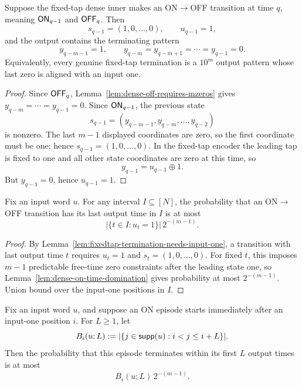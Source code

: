 \begin{lemma}
\label{lem:fixedtap-termination-needs-input-one}
Suppose the fixed-tap dense inner makes an ON\(\to\)OFF transition at time \(q\), meaning \(\mathsf{ON}_{q-1}\) and
\(\mathsf{OFF}_q\). Then
\[
s_{q-1}=(1,0,\dots,0),
\qquad
u_{q-1}=1,
\]
and the output contains the terminating pattern
\[
y_{q-m-1}=1,
\qquad
y_{q-m}=y_{q-m+1}=\cdots=y_{q-1}=0.
\]
Equivalently, every genuine fixed-tap termination is a \(10^m\) output pattern whose last zero is aligned with an input
one.
\end{lemma}

\begin{proof}
Since \(\mathsf{OFF}_q\), Lemma~\ref{lem:dense-off-requires-mzeros} gives
\(y_{q-m}=\cdots=y_{q-1}=0\). Since \(\mathsf{ON}_{q-1}\), the previous state
\[
s_{q-1}=(y_{q-m-1},y_{q-m},\dots,y_{q-2})
\]
is nonzero. The last \(m-1\) displayed coordinates are zero, so the first coordinate must be one; hence
\(s_{q-1}=(1,0,\dots,0)\). In the fixed-tap encoder the leading tap is fixed to one and all other state coordinates are
zero at this time, so
\[
y_{q-1}=u_{q-1}\oplus 1.
\]
But \(y_{q-1}=0\), hence \(u_{q-1}=1\).
\end{proof}

\begin{lemma}
\label{lem:fixedtap-termination-candidates}
Fix an input word \(u\). For any interval \(I\subseteq[N]\), the probability that an ON\(\to\)OFF transition has its
last output time in \(I\) is at most
\[
|\{t\in I:u_t=1\}|\,2^{-(m-1)}.
\]
\end{lemma}

\begin{proof}
By Lemma~\ref{lem:fixedtap-termination-needs-input-one}, a transition with last output time \(t\) requires \(u_t=1\)
and \(s_t=(1,0,\dots,0)\). For fixed \(t\), this imposes \(m-1\) predictable free-time zero constraints after the
leading state one, so Lemma~\ref{lem:dense-on-time-domination} gives probability at most \(2^{-(m-1)}\). Union bound
over the input-one positions in \(I\).
\end{proof}

\begin{lemma}
\label{lem:fixedtap-one-episode-termination}
Fix an input word \(u\), and suppose an ON episode starts immediately after an input-one position \(i\). For
\(L\ge 1\), let
\[
B_i(u;L):=
|\{j\in \mathsf{supp}(u): i<j\le i+L\}|.
\]
Then the probability that this episode terminates within its first \(L\) output times is at most
\[
B_i(u;L)\,2^{-(m-1)}.
\]
\end{lemma}

